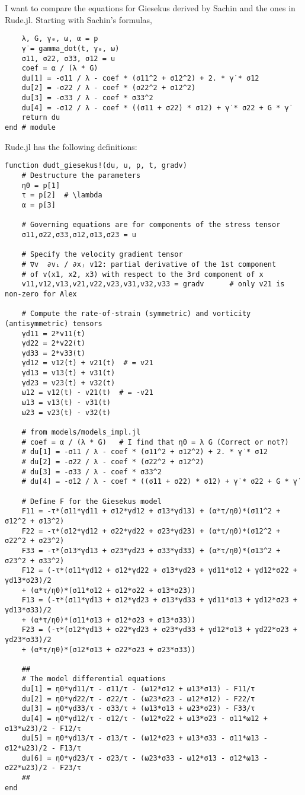 \documentclass[10pt]{article}
\begin{document}
I want to compare the equations for Giesekus derived by Sachin and the ones in Rude.jl. 
Starting with Sachin's formulas, 
\begin{verbatim}
    λ, G, γ₀, ω, α = p
    γ̇ = gamma_dot(t, γ₀, ω)
    σ11, σ22, σ33, σ12 = u
    coef = α / (λ * G) 
    du[1] = -σ11 / λ - coef * (σ11^2 + σ12^2) + 2. * γ̇ * σ12 
    du[2] = -σ22 / λ - coef * (σ22^2 + σ12^2)
    du[3] = -σ33 / λ - coef * σ33^2
    du[4] = -σ12 / λ - coef * ((σ11 + σ22) * σ12) + γ̇ * σ22 + G * γ̇
    return du
end # module
\end{verbatim}
Rude.jl has the following definitions: 
\begin{verbatim}
function dudt_giesekus!(du, u, p, t, gradv)
    # Destructure the parameters
    η0 = p[1]
    τ = p[2]  # \lambda
    α = p[3]

    # Governing equations are for components of the stress tensor
    σ11,σ22,σ33,σ12,σ13,σ23 = u

    # Specify the velocity gradient tensor
    # ∇v  ∂vᵢ / ∂xⱼ v12: partial derivative of the 1st component 
    # of v(x1, x2, x3) with respect to the 3rd component of x
	v11,v12,v13,v21,v22,v23,v31,v32,v33 = gradv      # only v21 is non-zero for Alex

    # Compute the rate-of-strain (symmetric) and vorticity (antisymmetric) tensors
    γd11 = 2*v11(t)  
    γd22 = 2*v22(t) 
    γd33 = 2*v33(t)
    γd12 = v12(t) + v21(t)  # = v21
    γd13 = v13(t) + v31(t)
    γd23 = v23(t) + v32(t)
    ω12 = v12(t) - v21(t)  # = -v21
    ω13 = v13(t) - v31(t)  
    ω23 = v23(t) - v32(t)

	# from models/models_impl.jl
	# coef = α / (λ * G)   # I find that η0 = λ G (Correct or not?) 
    # du[1] = -σ11 / λ - coef * (σ11^2 + σ12^2) + 2. * γ̇ * σ12 
    # du[2] = -σ22 / λ - coef * (σ22^2 + σ12^2)
    # du[3] = -σ33 / λ - coef * σ33^2
    # du[4] = -σ12 / λ - coef * ((σ11 + σ22) * σ12) + γ̇ * σ22 + G * γ̇

    # Define F for the Giesekus model
    F11 = -τ*(σ11*γd11 + σ12*γd12 + σ13*γd13) + (α*τ/η0)*(σ11^2 + σ12^2 + σ13^2)
    F22 = -τ*(σ12*γd12 + σ22*γd22 + σ23*γd23) + (α*τ/η0)*(σ12^2 + σ22^2 + σ23^2)
    F33 = -τ*(σ13*γd13 + σ23*γd23 + σ33*γd33) + (α*τ/η0)*(σ13^2 + σ23^2 + σ33^2)
    F12 = (-τ*(σ11*γd12 + σ12*γd22 + σ13*γd23 + γd11*σ12 + γd12*σ22 + γd13*σ23)/2
    + (α*τ/η0)*(σ11*σ12 + σ12*σ22 + σ13*σ23))
    F13 = (-τ*(σ11*γd13 + σ12*γd23 + σ13*γd33 + γd11*σ13 + γd12*σ23 + γd13*σ33)/2
    + (α*τ/η0)*(σ11*σ13 + σ12*σ23 + σ13*σ33))
    F23 = (-τ*(σ12*γd13 + σ22*γd23 + σ23*γd33 + γd12*σ13 + γd22*σ23 + γd23*σ33)/2
    + (α*τ/η0)*(σ12*σ13 + σ22*σ23 + σ23*σ33))

    ##
    # The model differential equations
    du[1] = η0*γd11/τ - σ11/τ - (ω12*σ12 + ω13*σ13) - F11/τ
    du[2] = η0*γd22/τ - σ22/τ - (ω23*σ23 - ω12*σ12) - F22/τ
    du[3] = η0*γd33/τ - σ33/τ + (ω13*σ13 + ω23*σ23) - F33/τ
    du[4] = η0*γd12/τ - σ12/τ - (ω12*σ22 + ω13*σ23 - σ11*ω12 + σ13*ω23)/2 - F12/τ
    du[5] = η0*γd13/τ - σ13/τ - (ω12*σ23 + ω13*σ33 - σ11*ω13 - σ12*ω23)/2 - F13/τ
    du[6] = η0*γd23/τ - σ23/τ - (ω23*σ33 - ω12*σ13 - σ12*ω13 - σ22*ω23)/2 - F23/τ
    ##
end
\end{verbatim}
\end{document}
